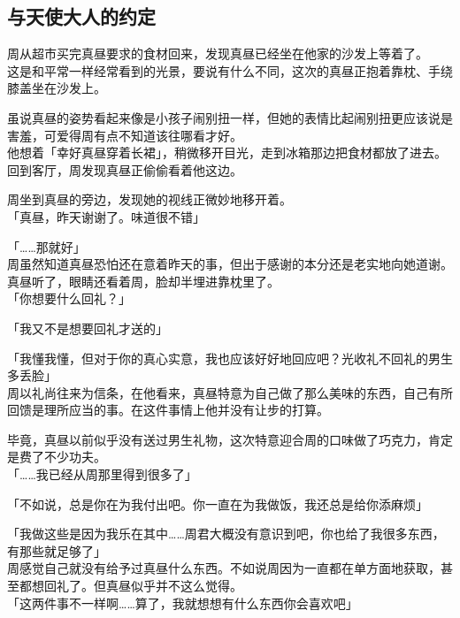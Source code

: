 \subsection{与天使大人的约定}

周从超市买完真昼要求的食材回来，发现真昼已经坐在他家的沙发上等着了。\\

这是和平常一样经常看到的光景，要说有什么不同，这次的真昼正抱着靠枕、手绕膝盖坐在沙发上。

虽说真昼的姿势看起来像是小孩子闹别扭一样，但她的表情比起闹别扭更应该说是害羞，可爱得周有点不知道该往哪看才好。\\

他想着「幸好真昼穿着长裙」，稍微移开目光，走到冰箱那边把食材都放了进去。回到客厅，周发现真昼正偷偷看着他这边。

周坐到真昼的旁边，发现她的视线正微妙地移开着。\\

「真昼，昨天谢谢了。味道很不错」

「……那就好」\\

周虽然知道真昼恐怕还在意着昨天的事，但出于感谢的本分还是老实地向她道谢。真昼听了，眼睛还看着周，脸却半埋进靠枕里了。\\

「你想要什么回礼？」

「我又不是想要回礼才送的」

「我懂我懂，但对于你的真心实意，我也应该好好地回应吧？光收礼不回礼的男生多丢脸」\\

周以礼尚往来为信条，在他看来，真昼特意为自己做了那么美味的东西，自己有所回馈是理所应当的事。在这件事情上他并没有让步的打算。

毕竟，真昼以前似乎没有送过男生礼物，这次特意迎合周的口味做了巧克力，肯定是费了不少功夫。\\

「……我已经从周那里得到很多了」

「不如说，总是你在为我付出吧。你一直在为我做饭，我还总是给你添麻烦」

「我做这些是因为我乐在其中……周君大概没有意识到吧，你也给了我很多东西，有那些就足够了」\\

周感觉自己就没有给予过真昼什么东西。不如说周因为一直都在单方面地获取，甚至都想回礼了。但真昼似乎并不这么觉得。\\

「这两件事不一样啊……算了，我就想想有什么东西你会喜欢吧」\\

